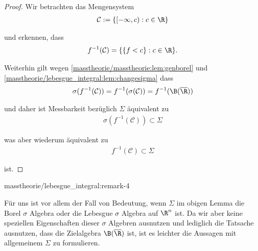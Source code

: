 \documentclass[letterpaper,10pt,german]{jupyterBook}
\begin{document}
\begin{proof}
 Wir betrachten das Mengensystem
\begin{align*}
\mathcal{C}:=\{[-\infty,c):c\in\R\}
\end{align*}
\par
und erkennen, dass
\begin{align*}
f^{-1}(\mathcal{C}) = \{\{f<c\}:c\in\R\}.
\end{align*}
\par
Weiterhin gilt wegen \cref{masstheorie/masstheorie:lem:genborel} und \cref{masstheorie/lebesgue_integral:lem:changesigma}  dass
\begin{align*}
\sigma(f^{-1}(\mathcal{C})) = f^{-1}(\sigma(\mathcal{C})) = f^{-1}(\B(\overline{\R}))
\end{align*}
\par
und daher ist Messbarkeit bezüglich \(\Sigma\) äquivalent zu
\begin{align*}
\sigma(f^{-1}(\mathcal{C})) \subset \Sigma
\end{align*}
\par
was aber wiederum äquivalent zu
\begin{align*}
f^{-1}(\mathcal{C}) \subset \Sigma
\end{align*}
\par
ist.
\end{proof}
\begin{remark}{}{masstheorie/lebesgue_integral:remark-4}



\par
Für uns ist vor allem der Fall von Bedeutung, wenn \(\Sigma\) im obigen Lemma die Borel \(\sigma\) Algebra oder die Lebesgue \(\sigma\) Algebra auf \(\R^n\) ist. Da wir aber keine speziellen Eigenschaften dieser \(\sigma\) Algebren ausnutzen und lediglich die Tatsache ausnutzen, dass die Zielalgebra \(\B(\overline{\R})\) ist, ist es leichter die Aussagen mit allgemeinem \(\Sigma\) zu formulieren.
\end{remark}
\end{document}
